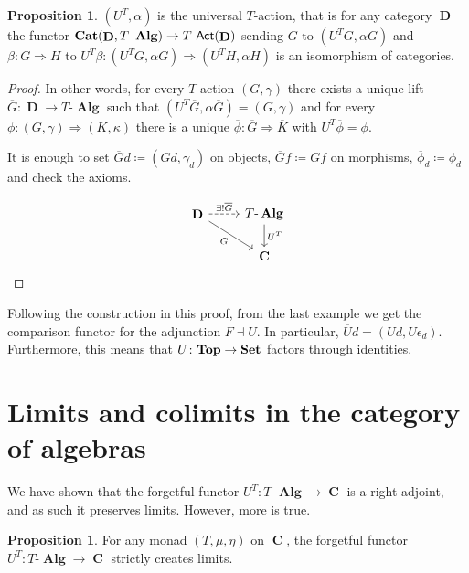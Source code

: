 \documentclass[a4paper,11pt,fullpage,oneside,openany]{amsbook}
\newcommand{\catname}[1]{{\normalfont\textbf{#1}}}
\DeclareMathOperator{\Alg}{\mathbf{Alg}}
\newcommand{\Set}{\catname{Set}}
\newcommand{\Top}{\catname{Top}}
\newcommand{\Cat}{\catname{Cat}}
\DeclareMathOperator{\C}{\mathbf{C}}
\DeclareMathOperator{\D}{\mathbf{D}}
\theoremstyle{definition}
\theoremstyle{definition}
\newtheorem{prop}[thm]{Proposition}
\theoremstyle{remark}
\begin{document}
\begin{prop}
	$(U^T,\alpha)$ is the universal $T$-action, that is for any category $\D$ the functor $\Cat(\D,T\mbox{-}\Alg)\rightarrow T\mbox{-}\mathsf{Act}(\D)$ sending $G$ to $(U^TG,\alpha G)$ and $\beta\colon G\Rightarrow H$ to $U^T\beta\colon(U^TG,\alpha G)\Rightarrow (U^TH,\alpha H)$ is an isomorphism of categories.
\end{prop}

\begin{proof}
	In other words, for every $T$-action $(G,\gamma)$ there exists a unique lift $\overline{G}\colon\D\rightarrow T\mbox{-}\Alg$ such that $(U^T\overline{G},\alpha\overline{G})=(G,\gamma)$ and for every $\phi\colon(G,\gamma)\Rightarrow (K,\kappa)$ there is a unique $\overline{\phi}\colon\overline{G}\Rightarrow\overline{K}$ with $U^T\overline{\phi}=\phi$.
	
	It is enough to set $\overline{G}d\coloneqq(Gd,\gamma_d)$ on objects, $\overline{G}f\coloneqq Gf$ on morphisms, $\overline{\phi}_d\coloneqq\phi_d$ and check the axioms.
	
	\[
		\begin{tikzcd}
			\D\ar[r, dashed, "\exists!\overline{G}"]\ar[dr, swap, "G"]
			& T\mbox{-}\Alg\ar[d, "U^T"] \\
			& \C
		\end{tikzcd}    
	\]			
\end{proof}

Following the construction in this proof, from the last example we get the comparison functor for the adjunction $F\dashv U$. In particular, $\overline{U}d=(Ud,U\epsilon_d)$. Furthermore, this means that $U\colon\Top\rightarrow\Set$ factors through identities.


\section{Limits and colimits in the category of algebras}

We have shown that the forgetful functor $U^T\colon T\mbox{-}\Alg\rightarrow\C$ is a right adjoint, and as such it preserves limits. However, more is true.

\begin{prop}\label{create lims}
	For any monad $(T,\mu,\eta)$ on $\C$, the forgetful functor $U^T\colon T\mbox{-}\Alg\rightarrow\C$ strictly creates limits.
\end{prop}
\end{document}
